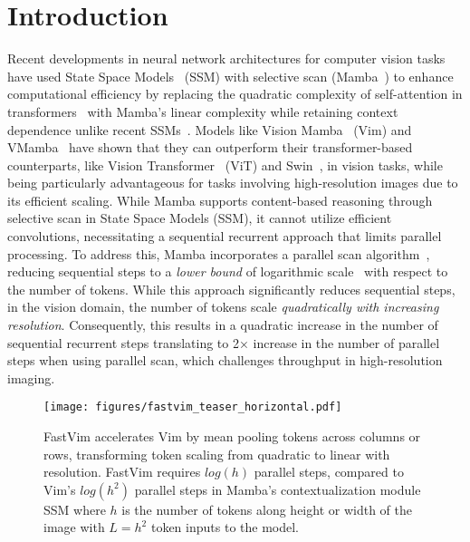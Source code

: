 \section{Introduction}
\label{sec:introduction}

Recent developments in neural network architectures for computer vision tasks have used State Space Models~\cite{gu2021efficiently} (SSM) with selective scan (Mamba~\cite{mamba}) to enhance computational efficiency by replacing the quadratic complexity of self-attention in transformers~\cite{vaswani2017attention} with Mamba's linear complexity while retaining context dependence unlike recent SSMs~\cite{gu2021efficiently}. Models like Vision Mamba~\cite{vim} (Vim) and VMamba~\cite{vmamba} have shown that they can outperform their transformer-based counterparts, like Vision Transformer~\cite{vit} (ViT) and Swin~\cite{liu2021swin}, in vision tasks, while being particularly advantageous for tasks involving high-resolution images due to its efficient scaling. While Mamba supports content-based reasoning through selective scan in State Space Models (SSM), it cannot utilize efficient convolutions, necessitating a sequential recurrent approach that limits parallel processing. To address this, Mamba incorporates a parallel scan algorithm~\cite{blelloch1990prefix}, reducing sequential steps to a \textit{lower bound} of logarithmic scale~\cite{smith2022simplified} with respect to the number of tokens. While this approach significantly reduces sequential steps, in the vision domain, the number of tokens scale \textit{quadratically with increasing resolution}. Consequently, this results in a quadratic increase in the number of sequential recurrent steps translating to 2× increase in the number of parallel steps when using parallel scan, which challenges throughput in high-resolution imaging. 


\begin{figure}[!t]
\centering
    \texttt{[image: figures/fastvim\_teaser\_horizontal.pdf]} 
    \caption{
    FastVim accelerates Vim by mean pooling tokens across columns or rows, transforming token scaling from quadratic to linear with resolution. FastVim requires $log(h)$ parallel steps, compared to Vim's $log(h^2)$ parallel steps in Mamba's contextualization module SSM where $h$ is the number of tokens along height or width of the image with $L = h^2$ token inputs to the model.
    }
     \vspace{-6pt}
    \label{fig:teaser}
\end{figure}


